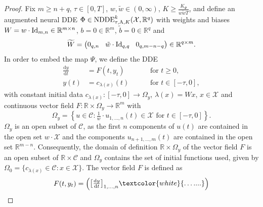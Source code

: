\documentclass[10pt]{article}
\numberwithin{equation}{section}
\newcommand*{\dd}{\mathrm{d}}
\begin{document}
	\begin{proof}
		Fix $m \geq n+q$, $\tau\in[0,T]$, $w, \tilde w \in (0,\infty)$, $K \geq \frac{K_\Psi}{w \tilde w T}$, and define an augmented neural DDE $\Phi \in \textup{NDDE}_{\tau,\textup{A},K}^k(\mathcal{X},\mathbb{R}^q)$ with weights and biases $W = w \cdot  \textup{Id}_{m,n}\in\mathbb{R}^{m \times n}$, $b = 0\in\mathbb{R}^m$, $\tilde{b} = 0 \in \mathbb{R}^q$ and
		\begin{equation*}
			\widetilde{W} = \begin{pmatrix}
				0_{q,n} && \hspace{-4mm}\tilde w \cdot \textup{Id}_{q,q} && \hspace{-4mm} 0_{q,m-n-q}
			\end{pmatrix} \in \mathbb{R}^{q \times m}.
		\end{equation*}
		In order to embed the map $\Psi$, we define the DDE
		\begin{equation}\label{eq:DDE_universal_aug}
			\begin{aligned}
				\frac{\dd y}{\dd t} &= F(t,y_t) \qquad &&\text{for } t\geq 0, \\  
				y(t) &= c_{\lambda(x)}(t) &&\text{for } t \in [-\tau,0],
			\end{aligned}
		\end{equation}
		with constant initial data $c_{\lambda(x)}:[-\tau,0]\rightarrow \Omega_y$, $\lambda(x) = Wx$, $x \in \mathcal{X}$ and continuous vector field $	F: \mathbb{R}\times \Omega_y\rightarrow \mathbb{R}^m$ with 
		\begin{equation*}
			\Omega_y =   \left\{u\in\mathcal{C}: \tfrac{1}{w}\cdot u_{1,\ldots,n}(t) \in \mathcal{X} \text{ for } t \in [-\tau,0]\right\}.
		\end{equation*}
		$\Omega_y$ is an open subset of $\mathcal{C}$, as the first $n$ components of $u(t)$ are contained in the open set $w \cdot \mathcal{X}$ and the components $u_{n+1,\ldots,m}(t)$ are contained in the open set $\mathbb{R}^{m-n}$.  Consequently, the domain of definition  $\mathbb{R}\times \Omega_y$ of the vector field $F$ is an open subset of $\mathbb{R} \times \mathcal{C}$ and $\Omega_y$ contains the  set of initial functions used, given by $\Omega_0 = \{c_{\lambda(x)}\in\mathcal{C}:x\in\mathcal{X}\}$. The vector field $F$ is defined as 
		\begin{equation} \label{eq:vectorfield_aug}
			F(t,y_t) =\begin{pmatrix}
				\big[\frac{\dd y}{\dd t}\big]_{1,\ldots,n} \textcolor{white}{\ldots ....} \\

\end{pmatrix}
\end{equation}
\end{proof}
\end{document}
